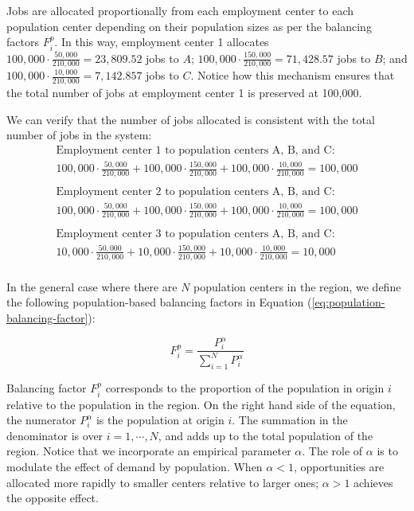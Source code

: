 \documentclass[]{elsarticle} %
\begin{document}
Jobs are allocated proportionally from each employment center to each
population center depending on their population sizes as per the
balancing factors \(F^p_i\). In this way, employment center 1 allocates
\(100,000\cdot \frac{50,000}{210,000}= 23,809.52\) jobs to \(A\);
\(100,000\cdot \frac{150,000}{210,000}= 71,428.57\) jobs to \(B\); and
\(100,000\cdot \frac{10,000}{210,000}= 7,142.857\) jobs to \(C\). Notice
how this mechanism ensures that the total number of jobs at employment
center 1 is preserved at 100,000.

We can verify that the number of jobs allocated is consistent with the
total number of jobs in the system: \[
\begin{array}{l}
\text{Employment center 1 to population centers A, B, and C: }\\
100,000 \cdot \frac{50,000}{210,000} + 100,000 \cdot \frac{150,000}{210,000} + 100,000 \cdot \frac{10,000}{210,000} = 100,000\\
\\
\text{Employment center 2 to population centers A, B, and C: }\\
100,000 \cdot \frac{50,000}{210,000} + 100,000 \cdot \frac{150,000}{210,000} + 100,000 \cdot \frac{10,000}{210,000} = 100,000\\
\\
\text{Employment center 3 to population centers A, B, and C: }\\
10,000 \cdot \frac{50,000}{210,000} + 10,000 \cdot \frac{150,000}{210,000} + 10,000 \cdot \frac{10,000}{210,000} = 10,000\\
\end{array}
\]

In the general case where there are \(N\) population centers in the
region, we define the following population-based balancing factors in
Equation (\ref{eq:population-balancing-factor}):

\begin{equation}
\label{eq:population-balancing-factor}
F^p_{i} = \frac{P_{i}^\alpha}{\sum_{i=1}^N P_{i}^\alpha}
\end{equation}

Balancing factor \(F^p_{i}\) corresponds to the proportion of the
population in origin \(i\) relative to the population in the region. On
the right hand side of the equation, the numerator \(P_{i}^\alpha\) is
the population at origin \(i\). The summation in the denominator is over
\(i=1,\cdots,N\), and adds up to the total population of the region.
Notice that we incorporate an empirical parameter \(\alpha\). The role
of \(\alpha\) is to modulate the effect of demand by population. When
\(\alpha <1\), opportunities are allocated more rapidly to smaller
centers relative to larger ones; \(\alpha>1\) achieves the opposite
effect.
\end{document}
